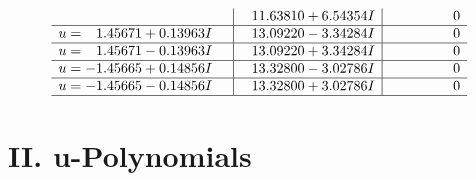 \documentclass[1p]{elsarticle_modified}
\theoremstyle{definition}
\begin{document}
$$\begin{array}{c|c|c}
 & \phantom{-}11.63810 + 6.54354 I & \phantom{-0.000000 } 0 \\ \hline\begin{aligned}
u &= \phantom{-}1.45671 + 0.13963 I\end{aligned}
 & \phantom{-}13.09220 - 3.34284 I & \phantom{-0.000000 } 0 \\ \hline\begin{aligned}
u &= \phantom{-}1.45671 - 0.13963 I\end{aligned}
 & \phantom{-}13.09220 + 3.34284 I & \phantom{-0.000000 } 0 \\ \hline\begin{aligned}
u &= -1.45665 + 0.14856 I\end{aligned}
 & \phantom{-}13.32800 - 3.02786 I & \phantom{-0.000000 } 0 \\ \hline\begin{aligned}
u &= -1.45665 - 0.14856 I\end{aligned}
 & \phantom{-}13.32800 + 3.02786 I & \phantom{-0.000000 } 0\\
 \hline 
 \end{array}$$\newpage
\newpage\renewcommand{\arraystretch}{1}
\centering \section*{ II. u-Polynomials}
\end{document}
